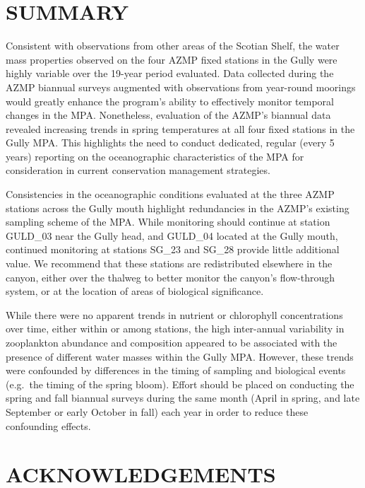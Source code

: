 \documentclass[12pt]{article}\usepackage[]{graphicx}\usepackage[]{color}
\begin{document}
\clearpage

\hypertarget{sec:summary}{%
\section{SUMMARY}\label{sec:summary}}

Consistent with observations from other areas of the Scotian Shelf, the water mass properties observed on the four AZMP fixed stations in the Gully were highly variable over the 19-year period evaluated. Data collected during the AZMP biannual surveys augmented with observations from year-round moorings would greatly enhance the program's ability to effectively monitor temporal changes in the MPA. Nonetheless, evaluation of the AZMP's biannual data revealed increasing trends in spring temperatures at all four fixed stations in the Gully MPA. This highlights the need to conduct dedicated, regular (every 5 years) reporting on the oceanographic characteristics of the MPA for consideration in current conservation management strategies.

Consistencies in the oceanographic conditions evaluated at the three AZMP stations across the Gully mouth highlight redundancies in the AZMP's existing sampling scheme of the MPA. While monitoring should continue at station GULD\_03 near the Gully head, and GULD\_04 located at the Gully mouth, continued monitoring at stations SG\_23 and SG\_28 provide little additional value. We recommend that these stations are redistributed elsewhere in the canyon, either over the thalweg to better monitor the canyon's flow-through system, or at the location of areas of biological significance.

While there were no apparent trends in nutrient or chlorophyll concentrations over time, either within or among stations, the high inter-annual variability in zooplankton abundance and composition appeared to be associated with the presence of different water masses within the Gully MPA. However, these trends were confounded by differences in the timing of sampling and biological events (e.g.~the timing of the spring bloom). Effort should be placed on conducting the spring and fall biannual surveys during the same month (April in spring, and late September or early October in fall) each year in order to reduce these confounding effects.

\clearpage

\hypertarget{sec:acknowledgements}{%
\section{ACKNOWLEDGEMENTS}\label{sec:acknowledgements}}
\end{document}
